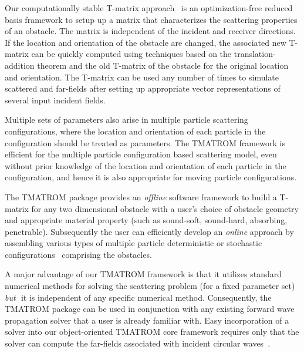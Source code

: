 \documentclass[12pt,letterpaper,final]{article}
\begin{document}
Our computationally stable T-matrix approach~\cite{gh:tmat2d, ghh:tmatrix}   is an optimization-free reduced basis framework to setup up a matrix that  characterizes the scattering properties of an obstacle.
The matrix is independent of the incident and receiver directions. If the location and orientation of
the obstacle are changed, the associated new T-matrix can be quickly computed using techniques based on the translation-addition
theorem and the old 
T-matrix of the obstacle for the original location and orientation.
The T-matrix  can  be used  any number of times to
simulate scattered and far-fields after  setting up  appropriate vector  representations of several input incident
fields. 

 

Multiple sets of parameters also arise in multiple particle scattering configurations, 
where the location and orientation of each particle in the configuration should be treated as parameters. 
The TMATROM framework is efficient
for the multiple particle configuration based scattering model, even
without prior knowledge of the location and orientation of each particle in the configuration, and
hence it is also appropriate for moving particle configurations. 

The TMATROM package provides an {\em offline} software framework to
build  a  T-matrix for any two dimensional obstacle with a user's choice of obstacle geometry and
appropriate material property (such as sound-soft, sound-hard, absorbing, penetrable).
Subsequently  the user  can efficiently develop an {\em online} approach 
by assembling various types of multiple particle deterministic or stochastic configurations~\cite{gh:stoc_mult}
comprising the obstacles. 



A major advantage of  our TMATROM framework is that it 
utilizes standard numerical methods for solving the scattering problem
(for a fixed parameter set)
{\em but}\,~it is
independent of  any 
specific numerical method.
Consequently, the TMATROM package  can be used in conjunction  with any existing 
forward wave propagation solver   that a user is already familiar with. 
Easy incorporation of  a solver into our object-oriented TMATROM core framework
requires only
that the solver can compute the far-fields associated with
incident  circular waves~\cite[Equation (2.15)]{ghh:tmatrix}.
\end{document}
